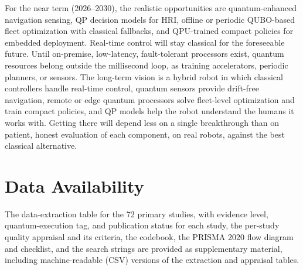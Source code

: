 \documentclass[acmsmall,screen,review]{acmart}
\begin{document}
For the near term (2026--2030), the realistic opportunities are quantum-enhanced navigation sensing, QP decision models for HRI, offline or periodic QUBO-based fleet optimization with classical fallbacks, and QPU-trained compact policies for embedded deployment. Real-time control will stay classical for the foreseeable future. Until on-premise, low-latency, fault-tolerant processors exist, quantum resources belong outside the millisecond loop, as training accelerators, periodic planners, or sensors. The long-term vision is a hybrid robot in which classical controllers handle real-time control, quantum sensors provide drift-free navigation, remote or edge quantum processors solve fleet-level optimization and train compact policies, and QP models help the robot understand the humans it works with. Getting there will depend less on a single breakthrough than on patient, honest evaluation of each component, on real robots, against the best classical alternative.

\section*{Data Availability}
The data-extraction table for the 72 primary studies, with evidence level, quantum-execution tag, and publication status for each study, the per-study quality appraisal and its criteria, the codebook, the PRISMA 2020 flow diagram and checklist, and the search strings are provided as supplementary material, including machine-readable (CSV) versions of the extraction and appraisal tables.



\end{document}
